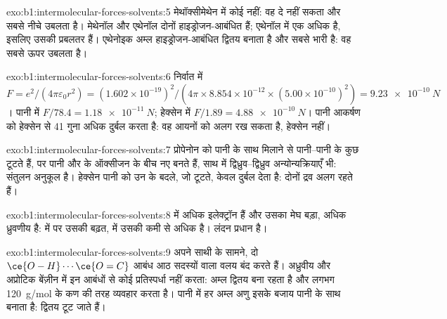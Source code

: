 \begin{solution}{exo:b1:intermolecular-forces-solvents:5}
मेथॉक्सीमेथेन में कोई  नहीं: वह  दे नहीं सकता और सबसे
नीचे उबलता है। मेथेनॉल और एथेनॉल दोनों हाइड्रोजन-आबंधित हैं; एथेनॉल में एक
 अधिक है, इसलिए उसकी  प्रबलतर हैं। एथेनोइक अम्ल
हाइड्रोजन-आबंधित द्वितय बनाता है और सबसे भारी है: वह सबसे ऊपर उबलता है।
\end{solution}

\begin{solution}{exo:b1:intermolecular-forces-solvents:6}
निर्वात में $F = e^2/(4\pi\varepsilon_0 r^2) = (1.602 \times
10^{-19})^2/(4\pi \times 8.854 \times 10^{-12} \times (5.00 \times
10^{-10})^2) = \qty{9.23e-10}{N}$। पानी में $F/78.4 = \qty{1.18e-11}{N}$;
हेक्सेन में $F/1.89 = \qty{4.88e-10}{N}$। पानी आकर्षण को हेक्सेन से 41
गुना अधिक दुर्बल करता है: वह आयनों को अलग रख सकता है, हेक्सेन नहीं।
\end{solution}

\begin{solution}{exo:b1:intermolecular-forces-solvents:7}
प्रोपेनोन को पानी के साथ मिलाने से पानी--पानी के कुछ  टूटते हैं, पर
पानी और  के ऑक्सीजन के बीच नए बनते हैं, साथ में
द्विध्रुव--द्विध्रुव अन्योन्यक्रियाएँ भी: संतुलन अनुकूल है। हेक्सेन पानी को
उन  के बदले, जो टूटते, केवल दुर्बल  देता है:
दोनों द्रव अलग रहते हैं।
\end{solution}

\begin{solution}{exo:b1:intermolecular-forces-solvents:8}
 में अधिक इलेक्ट्रॉन हैं और उसका मेघ बड़ा, अधिक ध्रुवणीय है:  में  पर उसकी बढ़त,  में उसकी कमी से
अधिक है। लंदन प्रधान है।
\end{solution}

\begin{solution}{exo:b1:intermolecular-forces-solvents:9}
 अपने साथी के सामने, दो
$\ce{O-H}\cdots\ce{O=C}$ आबंध आठ सदस्यों वाला वलय बंद करते हैं। अध्रुवीय और
अप्रोटिक बेंज़ीन में इन आबंधों से कोई प्रतिस्पर्धा नहीं करता: अम्ल
द्वितय बना रहता है और लगभग \qty{120}{g/mol} के कण की तरह व्यवहार करता है। पानी में
हर अम्ल अणु इसके बजाय पानी के साथ  बनाता है: द्वितय टूट जाते हैं।
\end{solution}

